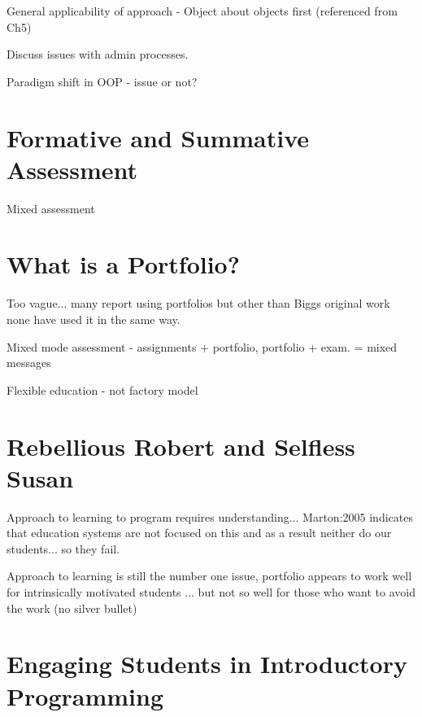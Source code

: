 

General applicability of approach - Object about objects first (referenced from Ch5)

Discuss issues with admin processes.

Paradigm shift in OOP
- issue or not?

\section{Formative and Summative Assessment} %
\label{sec:formative_and_summative_assessment}

Mixed assessment


\section{What is a Portfolio?} %
\label{sec:what_is_a_portfolio_}

Too vague... many report using portfolios but other than Biggs original work none have used it in the same way.


Mixed mode assessment - assignments + portfolio, portfolio + exam.
= mixed messages

Flexible education
- not factory model



\section{Rebellious Robert and Selfless Susan} %
\label{sec:rebellious_robert_and_selfless_susan}

Approach to learning to program requires understanding... Marton:2005 indicates that education systems are not focused on this and as a result neither do our students... so they fail.

Approach to learning is still the number one issue, portfolio appears to work well for intrinsically motivated students ... but not so well for those who want to avoid the work (no silver bullet)


\section{Engaging Students in Introductory Programming} %
\label{sec:engaging_students_in_introductory_programming}


